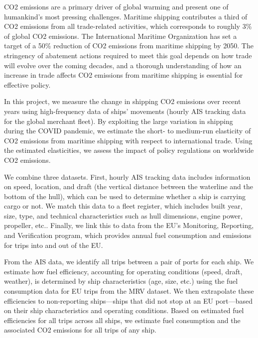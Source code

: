 \documentclass[hidelinks, 12pt,letterpaper]{article}
\begin{document}

 
CO2 emissions are a primary driver of global warming and present one of humankind's most pressing challenges. Maritime shipping contributes a third of CO2 emissions from all trade-related activities, which corresponds to roughly 3\% of global CO2 emissions. The International Maritime Organization has set a target of a 50\% reduction of CO2 emissions from maritime shipping by 2050. The stringency of abatement actions required to meet this goal depends on how trade will evolve over the coming decades, and a thorough understanding of how an increase in trade affects CO2 emissions from maritime shipping is essential for effective policy. 

In this project, we measure the change in shipping CO2 emissions over recent years using high-frequency data of ships’ movements (hourly AIS tracking data for the global merchant fleet). By exploiting the large variation in shipping during the COVID pandemic, we estimate the short- to medium-run elasticity of CO2 emissions from maritime shipping with respect to international trade. Using the estimated elasticities, we assess the impact of policy regulations on worldwide CO2 emissions. 

We combine three datasets. First, hourly AIS tracking data includes information on speed, location, and draft (the vertical distance between the waterline and the bottom of the hull), which can be used to determine whether a ship is carrying cargo or not. We match this data to a fleet register, which includes built year, size, type, and technical characteristics such as hull dimensions, engine power, propeller, etc.. Finally, we link this to data from the EU’s Monitoring, Reporting, and Verification program, which provides annual fuel consumption and emissions for trips into and out of the EU.  

From the AIS data, we identify all trips between a pair of ports for each ship. We estimate how fuel efficiency, accounting for operating conditions (speed, draft, weather), is determined by ship characteristics (age, size, etc.) using the fuel consumption data for EU trips from the MRV dataset. We then extrapolate these efficiencies to non-reporting ships—ships that did not stop at an EU port—based on their ship characteristics and operating conditions. Based on estimated fuel efficiencies for all trips across all ships, we estimate fuel consumption and the associated CO2 emissions for all trips of any ship. 
\end{document}
